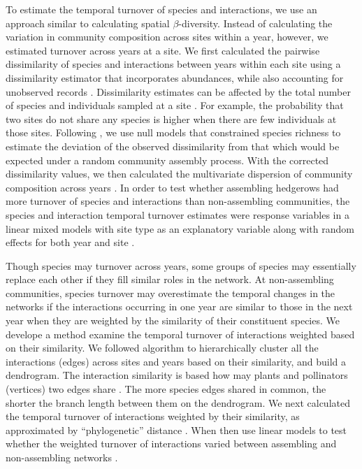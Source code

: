 \documentclass[12pt]{article}
\begin{document}
To estimate the temporal turnover of species and interactions, we use
an approach similar to calculating spatial $\beta$-diversity. Instead
of calculating the variation in community composition across sites
within a year, however, we estimated turnover across years at a
site. We first calculated the pairwise dissimilarity of species and
interactions between years within each site using a dissimilarity
estimator that incorporates abundances, while also accounting for
unobserved records \citep{chao-2005-148}. Dissimilarity estimates can
be affected by the total number of species and individuals sampled at
a site \citep[e.g.,][]{ponisio2015farm}. For example, the probability
that two sites do not share any species is higher when there are few
individuals at those sites. Following \cite{ponisio2015farm}, we use
null models that constrained species richness to estimate the
deviation of the observed dissimilarity from that which would be
expected under a random community assembly process. With the corrected
dissimilarity values, we then calculated the multivariate dispersion
of community composition across years \citep{anderson-2011-19}. In
order to test whether assembling hedgerows had more turnover of
species and interactions than non-assembling communities, the species
and interaction temporal turnover estimates were response variables in
a linear mixed models with site type as an explanatory variable along
with random effects for both year and site \citep{lme4, lmetest}.

Though species may turnover across years, some groups of species may
essentially replace each other if they fill similar roles in the
network. At non-assembling communities, species turnover may
overestimate the temporal changes in the networks if the interactions
occurring in one year are similar to those in the next year when they
are weighted by the similarity of their constituent species. We
develope a method examine the temporal turnover of interactions
weighted based on their similarity. We followed \cite{ahn2010link}
algorithm to hierarchically cluster all the interactions (edges)
across sites and years based on their similarity, and build a
dendrogram. The interaction similarity is based how may plants and
pollinators (vertices) two edges share \citep{ahn2010link,
  kalinka2011linkcomm}. The more species edges shared in common, the
shorter the branch length between them on the dendrogram.  We next
calculated the temporal turnover of interactions weighted by their
similarity, as approximated by ``phylogenetic'' distance
\citep{graham2008phylogenetic, picante-2010-1463}. When then use
linear models to test whether the weighted turnover of interactions
varied between assembling and non-assembling networks \citep{lme4,
  lmetest}.
\end{document}
